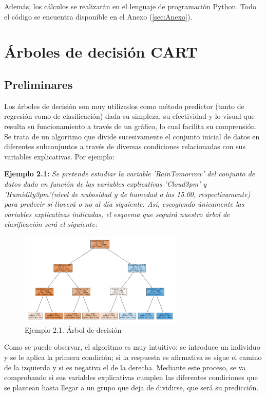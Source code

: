 \documentclass[12pt,twoside]{article}
\begin{document}
Además, los cálculos se realizarán en el lenguaje de programación Python. Todo el código se encuentra disponible en el Anexo (\ref{sec:Anexo}).



\newpage



\section{Árboles de decisión CART}
\subsection{Preliminares}

Los árboles de decisión son muy utilizados como método predictor (tanto de regresión como de clasificación) dada su simpleza, su efectividad y lo visual que resulta su funcionamiento a través de un gráfico, lo cual facilita su comprensión. Se trata de un algoritmo que divide sucesivamente el conjunto inicial de datos en diferentes subconjuntos a través de diversas condiciones relacionadas con sus variables explicativas. Por ejemplo:

\textbf{Ejemplo 2.1: } \textit{Se pretende estudiar la variable 'RainTomorrow' del conjunto de datos dado en función de las variables explicativas 'Cloud3pm' y 'Humidity3pm'(nivel de nubosidad y de humedad a las 15.00, respectivamente) para predecir si lloverá o no al día siguiente. Así, escogiendo únicamente las variables explicativas indicadas, el esquema que seguirá nuestro árbol de clasificación será el siguiente: }
\begin{figure}[h]
	\centering
	\includegraphics[width = 0.7\textwidth]{ex2_1_01}
	\caption{Ejemplo 2.1. Árbol de decisión}
	\label{fig:Ejemplo 2.1}
\end{figure}

Como se puede observar, el algoritmo es muy intuitivo: se introduce un individuo y se le aplica la primera condición; si la respuesta es afirmativa se sigue el camino de la izquierda y si es negativa el de la derecha. Mediante este proceso, se va comprobando si sus variables explicativas cumplen las diferentes condiciones que se plantean hasta llegar a un grupo que deja de dividirse, que será su predicción.
\end{document}

